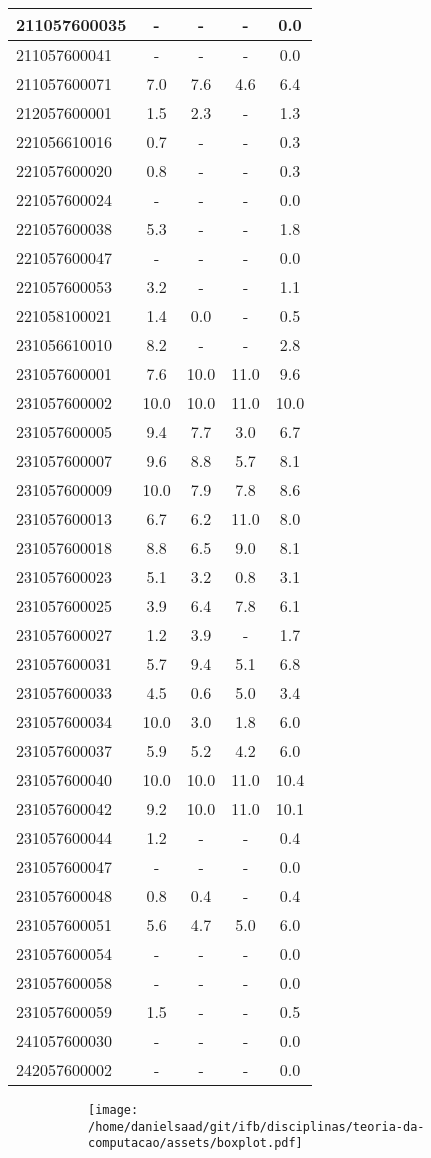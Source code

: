 \documentclass{article}
\begin{document}
\begin{longtable}{|l|c|c|c|c|}
211057600035 & - & - & - & 0.0\\\hline
211057600041 & - & - & - & 0.0\\\hline
211057600071 & 7.0 & 7.6 & 4.6 & 6.4\\\hline
212057600001 & 1.5 & 2.3 & - & 1.3\\\hline
221056610016 & 0.7 & - & - & 0.3\\\hline
221057600020 & 0.8 & - & - & 0.3\\\hline
221057600024 & - & - & - & 0.0\\\hline
221057600038 & 5.3 & - & - & 1.8\\\hline
221057600047 & - & - & - & 0.0\\\hline
221057600053 & 3.2 & - & - & 1.1\\\hline
221058100021 & 1.4 & 0.0 & - & 0.5\\\hline
231056610010 & 8.2 & - & - & 2.8\\\hline
231057600001 & 7.6 & 10.0 & 11.0 & 9.6\\\hline
231057600002 & 10.0 & 10.0 & 11.0 & 10.0\\\hline
231057600005 & 9.4 & 7.7 & 3.0 & 6.7\\\hline
231057600007 & 9.6 & 8.8 & 5.7 & 8.1\\\hline
231057600009 & 10.0 & 7.9 & 7.8 & 8.6\\\hline
231057600013 & 6.7 & 6.2 & 11.0 & 8.0\\\hline
231057600018 & 8.8 & 6.5 & 9.0 & 8.1\\\hline
231057600023 & 5.1 & 3.2 & 0.8 & 3.1\\\hline
231057600025 & 3.9 & 6.4 & 7.8 & 6.1\\\hline
231057600027 & 1.2 & 3.9 & - & 1.7\\\hline
231057600031 & 5.7 & 9.4 & 5.1 & 6.8\\\hline
231057600033 & 4.5 & 0.6 & 5.0 & 3.4\\\hline
231057600034 & 10.0 & 3.0 & 1.8 & 6.0\\\hline
231057600037 & 5.9 & 5.2 & 4.2 & 6.0\\\hline
231057600040 & 10.0 & 10.0 & 11.0 & 10.4\\\hline
231057600042 & 9.2 & 10.0 & 11.0 & 10.1\\\hline
231057600044 & 1.2 & - & - & 0.4\\\hline
231057600047 & - & - & - & 0.0\\\hline
231057600048 & 0.8 & 0.4 & - & 0.4\\\hline
231057600051 & 5.6 & 4.7 & 5.0 & 6.0\\\hline
231057600054 & - & - & - & 0.0\\\hline
231057600058 & - & - & - & 0.0\\\hline
231057600059 & 1.5 & - & - & 0.5\\\hline
241057600030 & - & - & - & 0.0\\\hline
242057600002 & - & - & - & 0.0\\\hline
\end{longtable}
\begin{figure}[h!]
\centering\begin{subfigure}
        \centering
        \texttt{[image: /home/danielsaad/git/ifb/disciplinas/teoria-da-computacao/assets/boxplot.pdf]}
    \end{subfigure}\end{figure}
\end{document}
